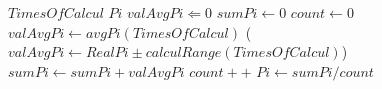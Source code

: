 \documentclass[11pt]{ctexart}
\begin{document}
\renewcommand{\thealgorithm}{4} %
    \begin{algorithm}
        \caption{$MonteCarlo()$} %
        \begin{algorithmic}[1] %
            \Require $TimesOfCalcul$
            \Ensure $Pi$
            \State $valAvgPi \Leftarrow 0$
            \State $sumPi \leftarrow 0$
            \State $count \leftarrow 0$
                \State $valAvgPi \leftarrow avgPi(TimesOfCalcul)$
                \If($valAvgPi \leftarrow RealPi\pm calculRange(TimesOfCalcul) $)
                    \State $sumPi \leftarrow sumPi + valAvgPi $
                    \State $count++$
                \EndIf
            \EndWhile
            \State $Pi \leftarrow sumPi / count $
        \end{algorithmic}
    \end{algorithm}
\end{document}
